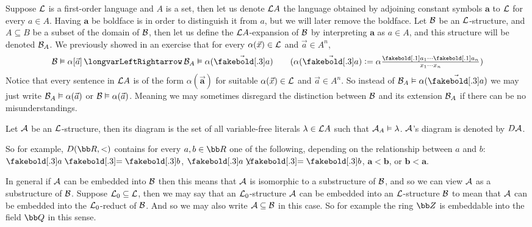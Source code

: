 Suppose ${\cal L}$ is a first-order language and $A$ is a set, then let us denote ${\cal L}A$ the language obtained by adjoining constant symbols $\boldsymbol a$ to ${\cal L}$ for every $a\in A$.
Having $\boldsymbol a$ be boldface is in order to distinguish it from $a$, but we will later remove the boldface.
Let ${\cal B}$ be an ${\cal L}$-structure, and $A\subseteq B$ be a subset of the domain of ${\cal B}$, then let us define the ${\cal L}A$-expansion of ${\cal B}$ by interpreting $\boldsymbol a$ as $a\in A$,
and this structure will be denoted ${\cal B}_A$.
We previously showed in an exercise that for every $\alpha(\vec x)\in{\cal L}$ and $\vec a\in A^n$,
$$ {\cal B}\vDash\alpha[\vec a] \iff {\cal B}_A\vDash\alpha(\vec{\boldsymbol a})\qquad (\alpha(\vec{\boldsymbol a})\coloneqq\alpha\tfrac{\boldsymbol a_1\cdots\boldsymbol a_n}{x_1\cdots x_n}) $$
Notice that every sentence in ${\cal L}A$ is of the form $\alpha(\vec{\boldsymbol a})$ for suitable $\alpha(\vec x)\in{\cal L}$ and $\vec a\in A^n$.
So instead of ${\cal B}_A\vDash\alpha(\vec{\boldsymbol a})$ we may just write ${\cal B}_A\vDash\alpha(\vec a)$ or ${\cal B}\vDash\alpha(\vec a)$.
Meaning we may sometimes disregard the distinction between ${\cal B}$ and its extension ${\cal B}_A$ if there can be no misunderstandings.

\bdefn

    Let ${\cal A}$ be an ${\cal L}$-structure, then its {\emphcolor diagram} is the set of all variable-free literals $\lambda\in{\cal L}A$ such that ${\cal A}_A\vDash\lambda$.
    ${\cal A}$'s diagram is denoted by $D{\cal A}$.

\edefn

So for example, $D({\bb R},<)$ contains for every $a,b\in{\bb R}$ one of the following, depending on the relationship between $a$ and $b$: $\boldsymbol a\eq\boldsymbol b$, $\boldsymbol a\neqb\boldsymbol b$,
$\boldsymbol a<\boldsymbol b$, or $\boldsymbol b<\boldsymbol a$.

In general if ${\cal A}$ can be embedded into ${\cal B}$ then this means that ${\cal A}$ is isomorphic to a substructure of ${\cal B}$, and so we can view ${\cal A}$ as a substructure of ${\cal B}$.
Suppose ${\cal L}_0\subseteq{\cal L}$, then we may say that an ${\cal L}_0$-structure ${\cal A}$ can be embedded into an ${\cal L}$-structure ${\cal B}$ to mean that ${\cal A}$ can be embedded into the
${\cal L}_0$-reduct of ${\cal B}$.
And so we may also write ${\cal A}\subseteq{\cal B}$ in this case.
So for example the ring ${\bb Z}$ is embeddable into the field ${\bb Q}$ in this sense.

